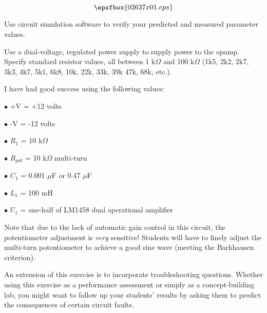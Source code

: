 

$$\epsfbox{02637x01.eps}$$

\vfil \eject






Use circuit simulation software to verify your predicted and measured parameter values.







Use a dual-voltage, regulated power supply to supply power to the opamp.  Specify standard resistor values, all between 1 k$\Omega$ and 100 k$\Omega$ (1k5, 2k2, 2k7, 3k3, 4k7, 5k1, 6k8, 10k, 22k, 33k, 39k 47k, 68k, etc.).

I have had good success using the following values:

\medskip
\item{$\bullet$} +V = +12 volts
\item{$\bullet$} -V = -12 volts
\item{$\bullet$} $R_1$ = 10 k$\Omega$
\item{$\bullet$} $R_{pot}$ = 10 k$\Omega$ multi-turn
\item{$\bullet$} $C_1$ = 0.001 $\mu$F or 0.47 $\mu$F
\item{$\bullet$} $L_1$ = 100 mH
\item{$\bullet$} $U_1$ = one-half of LM1458 dual operational amplifier
\medskip

Note that due to the lack of automatic gain control in this circuit, the potentiometer adjustment is {\it very} sensitive!  Students will have to finely adjust the multi-turn potentiometer to achieve a good sine wave (meeting the Barkhausen criterion).

An extension of this exercise is to incorporate troubleshooting questions.  Whether using this exercise as a performance assessment or simply as a concept-building lab, you might want to follow up your students' results by asking them to predict the consequences of certain circuit faults.




